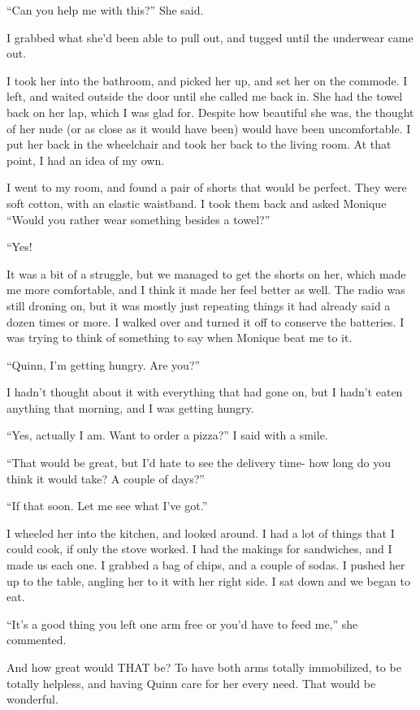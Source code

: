 ``Can you help me with this?'' She said.

I grabbed what she'd been able to pull out, and tugged until the underwear came out.

I took her into the bathroom, and picked her up, and set her on the commode. I left, and
waited outside the door until she called me back in. She had the towel back on her lap, which I
was glad for. Despite how beautiful she was, the thought of her nude (or as close as it would
have been) would have been uncomfortable. I put her back in the wheelchair and took her back to
the living room. At that point, I had an idea of my own.

I went to my room, and found a pair of shorts that would be perfect. They were soft cotton,
with an elastic waistband. I took them back and asked Monique ``Would you rather wear something
besides a towel?''

``Yes!

It was a bit of a struggle, but we managed to get the shorts on her, which made me more
comfortable, and I think it made her feel better as well. The radio was still droning on, but it
was mostly just repeating things it had already said a dozen times or more. I walked over and
turned it off to conserve the batteries. I was trying to think of something to say when Monique
beat me to it.

``Quinn, I'm getting hungry. Are you?''

I hadn't thought about it with everything that had gone on, but I hadn't eaten anything
that morning, and I was getting hungry.

``Yes, actually I am. Want to order a pizza?'' I said with a smile.

``That would be great, but I'd hate to see the delivery time- how long do you think it
would take? A couple of days?''

``If that soon. Let me see what I've got.''

I wheeled her into the kitchen, and looked around. I had a lot of things that I could cook,
if only the stove worked. I had the makings for sandwiches, and I made us each one. I grabbed a
bag of chips, and a couple of sodas. I pushed her up to the table, angling her to it with her
right side. I sat down and we began to eat.

``It's a good thing you left one arm free or you'd have to feed me,'' she commented.

\begin{thought}
And how great would THAT be? To have both arms totally immobilized, to be totally helpless,
and having Quinn care for her every need. That would be wonderful.
\end{thought}

